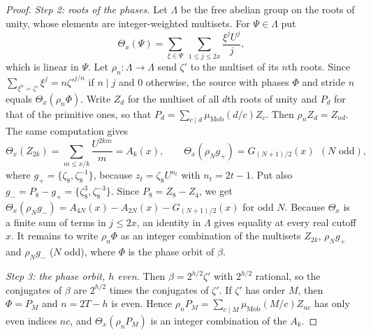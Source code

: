 \documentclass[11pt]{article}
\begin{document}
\begin{proof}
\emph{Step 2: roots of the phases.} Let $\Lambda$ be the free abelian group on the roots of unity, whose elements are integer-weighted multisets. For $\Psi\in\Lambda$ put
\[
 \Theta_x(\Psi)=\sum_{\xi\in\Psi}\ \sum_{1\le j\le 2x}\frac{\xi^jU^j}{j},
\]
which is linear in $\Psi$. Let $\rho_n:\Lambda\to\Lambda$ send $\zeta'$ to the multiset of its $n$th roots. Since $\sum_{\xi^n=\zeta'}\xi^j=n\zeta'^{j/n}$ if $n\mid j$ and $0$ otherwise, the source with phases $\Phi$ and stride $n$ equals $\Theta_x(\rho_n\Phi)$. Write $Z_d$ for the multiset of all $d$th roots of unity and $P_d$ for that of the primitive ones, so that $P_d=\sum_{c\mid d}\mu_{\mathrm{Mob}}(d/c)Z_c$. Then $\rho_nZ_d=Z_{nd}$. The same computation gives
\[
 \Theta_x(Z_{2k})=\sum_{m\le x/k}\frac{U^{2km}}{m}=A_k(x),\qquad
 \Theta_x(\rho_Ng_+)=G_{(N+1)/2}(x)\ \ (N\text{ odd}),
\]
where $g_+=\{\zeta_8,\zeta_8^{-1}\}$, because $z_t=\zeta_8U^{n_t}$ with $n_t=2t-1$. Put also $g_-=P_8-g_+=\{\zeta_8^3,\zeta_8^{-3}\}$. Since $P_8=Z_8-Z_4$, we get $\Theta_x(\rho_Ng_-)=A_{4N}(x)-A_{2N}(x)-G_{(N+1)/2}(x)$ for odd $N$. Because $\Theta_x$ is a finite sum of terms in $j\le2x$, an identity in $\Lambda$ gives equality at every real cutoff $x$. It remains to write $\rho_n\Phi$ as an integer combination of the multisets $Z_{2k}$, $\rho_Ng_+$ and $\rho_Ng_-$ ($N$ odd), where $\Phi$ is the phase orbit of $\beta$.

\emph{Step 3: the phase orbit, $h$ even.} Then $\beta=2^{h/2}\zeta'$ with $2^{h/2}$ rational, so the conjugates of $\beta$ are $2^{h/2}$ times the conjugates of $\zeta'$. If $\zeta'$ has order $M$, then $\Phi=P_M$ and $n=2T-h$ is even. Hence $\rho_nP_M=\sum_{c\mid M}\mu_{\mathrm{Mob}}(M/c)Z_{nc}$ has only even indices $nc$, and $\Theta_x(\rho_n P_M)$ is an integer combination of the $A_k$.


\end{proof}
\end{document}
